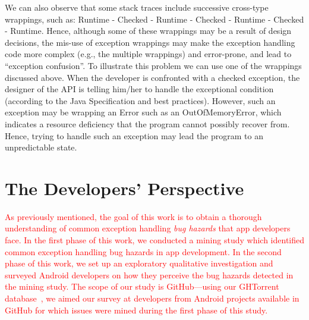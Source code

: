 We can also observe that some stack traces include successive cross-type wrappings,
such as: Runtime - Checked - Runtime - Checked - Runtime - Checked -
Runtime.
Hence, although some of these wrappings may be a result of design decisions, the mis-use of exception wrappings may make the exception handling
code more complex (e.g., the multiple wrappings) and error-prone,
 and lead to ``exception confusion''. To illustrate this problem we can use one of the wrappings discussed above.
When the developer is confronted with a checked exception, the designer of the API is telling him/her
to handle the exceptional condition (according to the Java Specification and
best practices). However, such an exception may be wrapping an Error such
as an OutOfMemoryError, which indicates a resource deficiency
that the program cannot possibly recover from. Hence, trying to
handle such an exception
may lead the program to an unpredictable state.

\bigskip


\bigskip

\section{The Developers' Perspective}
\label{sec:dev}


\textcolor{red}{As previously mentioned, the goal of this work is to obtain a thorough understanding of common exception handling \emph{bug hazards} that app developers face. In the first phase of this work, we conducted a mining study which identified common exception handling bug hazards in app development.
 In the second phase of this work, we set up an exploratory qualitative investigation and surveyed Android developers on how they perceive the bug hazards detected in the mining study. The scope of our study is GitHub---using our GHTorrent database~\cite{Gousi13}, we aimed our survey at developers from Android projects available in GitHub for which issues were mined during the first phase of this study.}

